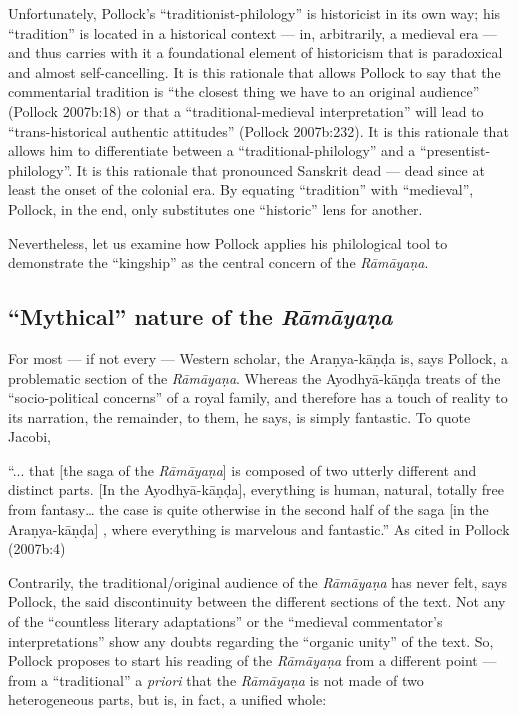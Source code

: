 Unfortunately, Pollock’s “traditionist-philology” is historicist in its own way; his “tradition” is located in a historical context --- in, arbitrarily, a medieval era --- and thus carries with it a foundational element of historicism that is paradoxical and almost self-cancelling. It is this rationale that allows Pollock to say that the commentarial tradition is “the closest thing we have to an original audience” (Pollock 2007b:18) or that a “traditional-medieval interpretation” will lead to “trans-historical authentic attitudes” (Pollock 2007b:232). It is this rationale that allows him to differentiate between a “traditional-philology” and a “presentist-philology”. It is this rationale that pronounced Sanskrit dead --- dead since at least the onset of the colonial era. By equating “tradition” with “medieval”, Pollock, in the end, only substitutes one “historic” lens for another. 

Nevertheless, let us examine how Pollock applies his philological tool to demonstrate the “kingship” as the central concern of the {\sl Rāmāyaṇa}. 

\subsection{“Mythical” nature of the {\sl\bfseries Rāmāyaṇa}}\label{sec2.2}

For most --- if not every --- Western scholar, the Araṇya-kāṇḍa is, says Pollock, a problematic section of the {\sl Rāmāyaṇa}. Whereas the Ayodhyā-kāṇḍa treats of the “socio-political concerns” of a royal family, and therefore has a touch of reality to its narration, the remainder, to them, he says, is simply fantastic. To quote Jacobi,

\begin{myquote}
“... that [the saga of the {\sl Rāmāyaṇa}] is composed of two utterly different and distinct parts. [In the Ayodhyā-kāṇḍa], everything is human, natural, totally free from fantasy… the case is quite otherwise in the second half of the saga [in the Araṇya-kāṇḍa] , where everything is marvelous and fantastic.” 	
\hfill As cited in Pollock (2007b:4)
\end{myquote}

Contrarily, the traditional/original audience of the {\sl Rāmāyaṇa} has never felt, says Pollock, the said discontinuity between the different sections of the text. Not any of the “countless literary adaptations” or the “medieval commentator’s interpretations” show any doubts regarding the “organic unity” of the text. So, Pollock proposes to start his reading of the {\sl Rāmāyaṇa} from a different point --- from a “traditional” a {\sl priori} that the {\sl Rāmāyaṇa} is not made of two heterogeneous parts, but is, in fact, a unified whole:

